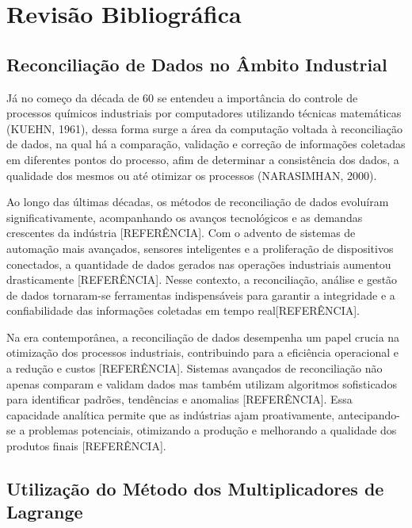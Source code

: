 \chapter{Revisão Bibliográfica} \label{RevisaoBibliografica}

\section{Reconciliação de Dados no Âmbito Industrial}

Já no começo da década de 60 se entendeu a importância do controle de processos químicos industriais por computadores utilizando técnicas matemáticas (KUEHN, 1961), dessa forma surge a área da computação voltada à reconciliação de dados, na qual há a comparação, validação e correção de informações coletadas em diferentes pontos do processo, afim de determinar a consistência dos dados, a qualidade dos mesmos ou até otimizar os processos (NARASIMHAN, 2000).

Ao longo das últimas décadas, os métodos de reconciliação de dados evoluíram significativamente, acompanhando os avanços tecnológicos e as demandas crescentes da indústria [REFERÊNCIA]. Com o advento de sistemas de automação mais avançados, sensores inteligentes e a proliferação de dispositivos conectados, a quantidade de dados gerados nas operações industriais aumentou drasticamente [REFERÊNCIA]. Nesse contexto, a reconciliação, análise e gestão de dados tornaram-se ferramentas indispensáveis para garantir a integridade e a confiabilidade das informações coletadas em tempo real[REFERÊNCIA].

Na era contemporânea, a reconciliação de dados desempenha um papel crucia na otimização dos processos industriais, contribuindo para a eficiência operacional e a redução e custos [REFERÊNCIA]. Sistemas avançados de reconciliação não apenas comparam e validam dados mas também utilizam algoritmos sofisticados para identificar padrões, tendências e anomalias [REFERÊNCIA]. Essa capacidade analítica permite que as indústrias ajam proativamente, antecipando-se a problemas potenciais, otimizando a produção e melhorando a qualidade dos produtos finais [REFERÊNCIA].

\section{Utilização do Método dos Multiplicadores de Lagrange}

